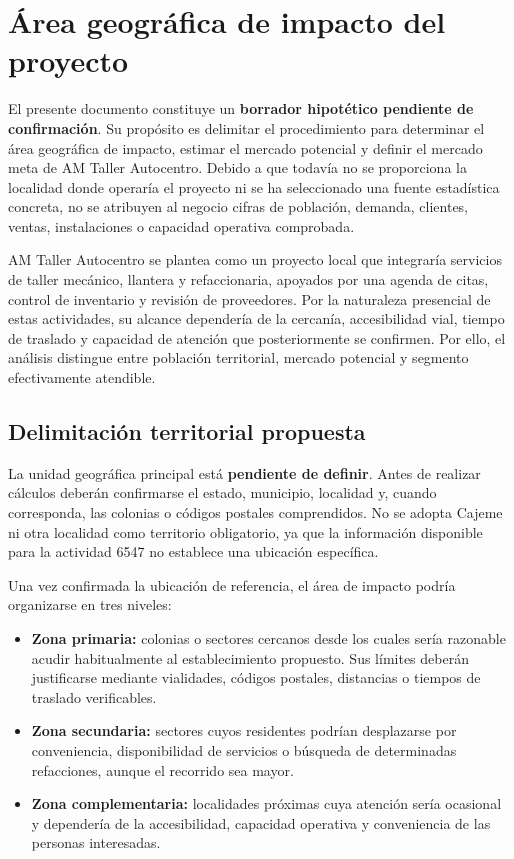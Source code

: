 \documentclass[12pt,letterpaper,oneside]{article}
\begin{document}
\section{Área geográfica de impacto del proyecto}

El presente documento constituye un \textbf{borrador hipotético pendiente de confirmación}. Su propósito es delimitar el procedimiento para determinar el área geográfica de impacto, estimar el mercado potencial y definir el mercado meta de AM Taller Autocentro. Debido a que todavía no se proporciona la localidad donde operaría el proyecto ni se ha seleccionado una fuente estadística concreta, no se atribuyen al negocio cifras de población, demanda, clientes, ventas, instalaciones o capacidad operativa comprobada.

AM Taller Autocentro se plantea como un proyecto local que integraría servicios de taller mecánico, llantera y refaccionaria, apoyados por una agenda de citas, control de inventario y revisión de proveedores. Por la naturaleza presencial de estas actividades, su alcance dependería de la cercanía, accesibilidad vial, tiempo de traslado y capacidad de atención que posteriormente se confirmen. Por ello, el análisis distingue entre población territorial, mercado potencial y segmento efectivamente atendible.

\subsection{Delimitación territorial propuesta}

La unidad geográfica principal está \textbf{pendiente de definir}. Antes de realizar cálculos deberán confirmarse el estado, municipio, localidad y, cuando corresponda, las colonias o códigos postales comprendidos. No se adopta Cajeme ni otra localidad como territorio obligatorio, ya que la información disponible para la actividad 6547 no establece una ubicación específica.

Una vez confirmada la ubicación de referencia, el área de impacto podría organizarse en tres niveles:

\begin{itemize}
    \item \textbf{Zona primaria:} colonias o sectores cercanos desde los cuales sería razonable acudir habitualmente al establecimiento propuesto. Sus límites deberán justificarse mediante vialidades, códigos postales, distancias o tiempos de traslado verificables.
    \item \textbf{Zona secundaria:} sectores cuyos residentes podrían desplazarse por conveniencia, disponibilidad de servicios o búsqueda de determinadas refacciones, aunque el recorrido sea mayor.
    \item \textbf{Zona complementaria:} localidades próximas cuya atención sería ocasional y dependería de la accesibilidad, capacidad operativa y conveniencia de las personas interesadas.
\end{itemize}
\end{document}
